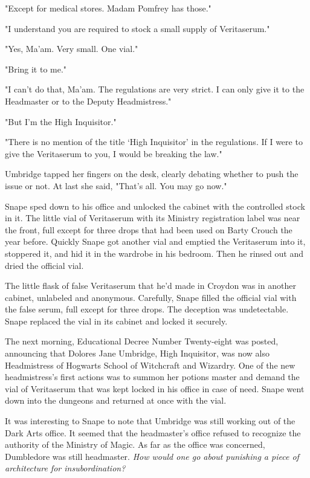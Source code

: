"Except for medical stores. Madam Pomfrey has those."

"I understand you are required to stock a small supply of Veritaserum."

"Yes, Ma'am. Very small. One vial."

"Bring it to me."

"I can't do that, Ma'am. The regulations are very strict. I can only give it to the Headmaster or to the Deputy Headmistress."

"But I'm the High Inquisitor."

"There is no mention of the title `High Inquisitor' in the regulations. If I were to give the Veritaserum to you, I would be breaking the law."

Umbridge tapped her fingers on the desk, clearly debating whether to push the issue or not. At last she said, "That's all. You may go now."

Snape sped down to his office and unlocked the cabinet with the controlled stock in it. The little vial of Veritaserum with its Ministry registration label was near the front, full except for three drops that had been used on Barty Crouch the year before. Quickly Snape got another vial and emptied the Veritaserum into it, stoppered it, and hid it in the wardrobe in his bedroom. Then he rinsed out and dried the official vial.

The little flask of false Veritaserum that he'd made in Croydon was in another cabinet, unlabeled and anonymous. Carefully, Snape filled the official vial with the false serum, full except for three drops. The deception was undetectable. Snape replaced the vial in its cabinet and locked it securely.

The next morning, Educational Decree Number Twenty-eight was posted, announcing that Dolores Jane Umbridge, High Inquisitor, was now also Headmistress of Hogwarts School of Witchcraft and Wizardry. One of the new headmistress's first actions was to summon her potions master and demand the vial of Veritaserum that was kept locked in his office in case of need. Snape went down into the dungeons and returned at once with the vial.

It was interesting to Snape to note that Umbridge was still working out of the Dark Arts office. It seemed that the headmaster's office refused to recognize the authority of the Ministry of Magic. As far as the office was concerned, Dumbledore was still headmaster. \emph{How would one go about punishing a piece of architecture for insubordination?}

